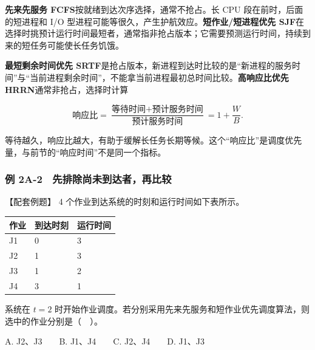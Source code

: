 \textbf{先来先服务 FCFS}按就绪到达次序选择，通常不抢占。长 CPU 段在前时，后面的短进程和 I/O 型进程可能等很久，产生护航效应。\textbf{短作业/短进程优先 SJF}在选择时挑预计运行时间最短者，通常指非抢占版本；它需要预测运行时间，持续到来的短任务可能使长任务饥饿。

\textbf{最短剩余时间优先 SRTF}是抢占版本，新进程到达时比较的是``新进程的服务时间''与``当前进程剩余时间''，不能拿当前进程最初总时间比较。\textbf{高响应比优先 HRRN}通常非抢占，选择时计算

\[\text{响应比}=\frac{\text{等待时间}+\text{预计服务时间}}{\text{预计服务时间}}=1+\frac{W}{B}.\]

等待越久，响应比越大，有助于缓解长任务长期等候。这个``响应比''是调度优先量，与前节的``响应时间''不是同一个指标。

\subsubsection{例 2A-2　先排除尚未到达者，再比较}\label{OS02-ex2-2}

\begin{example}[配套例题]

【配套例题】 4 个作业到达系统的时刻和运行时间如下表所示。

\begin{wideblock}

\par\medskip\noindent\begin{minipage}{\linewidth}\fontsize{9.3}{12}\selectfont\begin{tabularx}{\linewidth}{@{}YYY@{}}
\toprule\noalign{}
作业 & 到达时刻 & 运行时间 \\
\midrule\noalign{}


J1 & 0 & 3 \\
J2 & 1 & 3 \\
J3 & 1 & 2 \\
J4 & 3 & 1 \\
\bottomrule\end{tabularx}
\end{minipage}\par\medskip

\end{wideblock}

系统在 \(t=2\) 时开始作业调度。若分别采用先来先服务和短作业优先调度算法，则选中的作业分别是（　）。

A. J2、J3　　B. J1、J4　　C. J2、J4　　D. J1、J3

\end{example}

